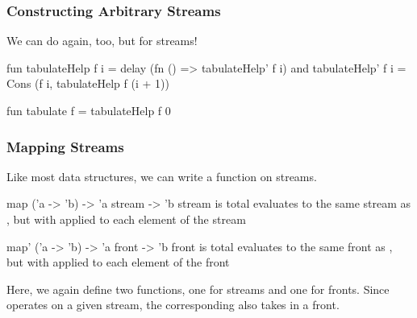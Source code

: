 \documentclass[aspectratio=169, handout]{beamer}
\begin{document}
\begin{frame}[fragile]
  \frametitle{Constructing Arbitrary Streams}

  We can do  again, too, but for streams!

  \pause
  \vspace{\fill}

  \begin{codeblock}
    fun tabulateHelp  f i = delay (fn () => tabulateHelp' f i)
    and tabulateHelp' f i = Cons (f i, tabulateHelp f (i + 1))

    fun tabulate f = tabulateHelp f 0
  \end{codeblock}

  \pause
  \vspace{\fill}

\end{frame}

\begin{frame}[fragile]
  \frametitle{Mapping Streams}

  Like most data structures, we can write a  function on streams.

  \pause
  \vspace{\fill}

  \spec
    {map}
    {('a -> 'b) -> 'a stream -> 'b stream}
    { is total}
    { evaluates to the same stream as , but with
     applied to each element of the stream}

  \pause
  \vspace{\fill}

  \spec
    {map'}
    {('a -> 'b) -> 'a front -> 'b front}
    { is total}
    { evaluates to the same front as , but with
     applied to each element of the front}

  \pause
  \vspace{\fill}

  Here, we again define two functions, one for streams and one
  for fronts. Since  operates on a given stream, the
  corresponding  also takes in a front.
\end{frame}
\end{document}

